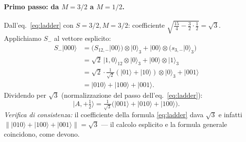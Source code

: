 \documentclass[11pt,a4paper]{article}
\newcommand{\ket}[1]{\lvert #1\rangle}
\begin{document}
\paragraph{Primo passo: da $M{=}3/2$ a $M{=}1/2$.} Dall'eq.~\eqref{eq:ladder}
con $S=3/2,M=3/2$: coefficiente $\sqrt{\tfrac{15}{4}-\tfrac32\cdot\tfrac12}=\sqrt3$.
Applichiamo $S_-$ al vettore esplicito:
\begin{align*}
S_-\ket{000} &= \big(S_{12,-}\ket{00}\big)\otimes\ket0_3 + \ket{00}\otimes\big(s_{3,-}\ket0_3\big)\\
&= \sqrt2\,\ket{1,0}_{12}\otimes\ket0_3 + \ket{00}\otimes\ket1_3\\
&= \sqrt2\cdot\tfrac{1}{\sqrt2}(\ket{01}+\ket{10})\otimes\ket0_3 + \ket{001}\\
&= \ket{010}+\ket{100}+\ket{001}.
\end{align*}
Dividendo per $\sqrt3$ (normalizzazione del passo dell'eq.~\eqref{eq:ladder}):
\begin{equation}
\ket{A,{+}\tfrac12} = \tfrac{1}{\sqrt3}\big(\ket{001}+\ket{010}+\ket{100}\big).
\label{eq:Ap12}
\end{equation}
\emph{Verifica di consistenza:} il coefficiente della formula \eqref{eq:ladder}
dava $\sqrt3$ e infatti $\|\ket{010}+\ket{100}+\ket{001}\|=\sqrt3$ — il calcolo
esplicito e la formula generale coincidono, come devono.
\end{document}
